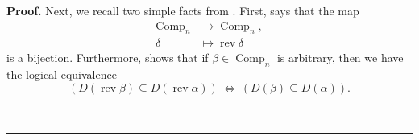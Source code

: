 \documentclass[numbers=enddot,12pt,final,onecolumn,notitlepage]{scrartcl}%
\theoremstyle{definition}
\newenvironment{proof}[1][Proof]{\noindent\textbf{#1.} }{\ \rule{0.5em}{0.5em}}
\newenvironment{vershort}{}{}
\begin{document}
\begin{vershort}
\begin{proof}
Next, we recall two simple facts from \cite{comps}. First, \cite[Corollary
3.10]{comps} says that the map%
\begin{align*}
\operatorname*{Comp}\nolimits_{n}  &  \rightarrow\operatorname*{Comp}%
\nolimits_{n},\\
\delta &  \mapsto\operatorname*{rev}\delta
\end{align*}
is a bijection. Furthermore, \cite[Proposition 3.11]{comps} shows that if
$\beta\in\operatorname*{Comp}\nolimits_{n}$ is arbitrary, then we have the
logical equivalence%
\begin{equation}
\left(  D\left(  \operatorname*{rev}\beta\right)  \subseteq D\left(
\operatorname*{rev}\alpha\right)  \right)  \ \Longleftrightarrow\ \left(
D\left(  \beta\right)  \subseteq D\left(  \alpha\right)  \right)  .
\label{pf.thm.eta.S2.short.equiv}%
\end{equation}



\end{proof}
\end{vershort}
\end{document}

